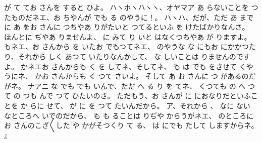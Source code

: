 が
て
てお
さんを
すると
ひよ。
ハヽホヽハヽヽ、オヤマア
あ
らないことを
つたものだネエ、お
ちやんが
でも
る
のやうに！。
ハヽハ、だが、ただ
あ
までに
あ
をお
さんに
つちやあ
りがたいと
つてるといふ
を
けたばかりなんさ。
ほんとに
ぢやあ
りませんよ、
に
みて
り
いと
はなくつちやあ
が
りますよ。
もネエ、お
さんから
を
いたお
でもつてネエ、
のやうな
な
にもお
にかかつたり、それから
しく
あつて
いたりなんかして、
な
しいことは
りませんのですよ。
かネエお
さんからも
く
を
してネ、そしてネ、
も
は
でも
をさせて
くやうにネ、
かお
さんからも
く
つて
さいよ。
そして
あ
お
さんに
つ
があるのだがネ。
ナアニ
な
でも
でも
いんで、ただ
へ
る
り
を
てネ、
くつても
の
へ
つて
の
つも
んで
つて
ひたいのさ。
ただもう、お
さんが
に
におなりだといふことを
か
らに
せて、
が
に
を
つて
たいんだから。
ア、それから
、
なに
ない
なところへ
いでのだから、
も
も
ることは
りぢや
からうがネエ、
のところにお
さんのこざ〳〵した
や
かがそつくり
て
る、
は
にでも
たして
しますからネ。
』

